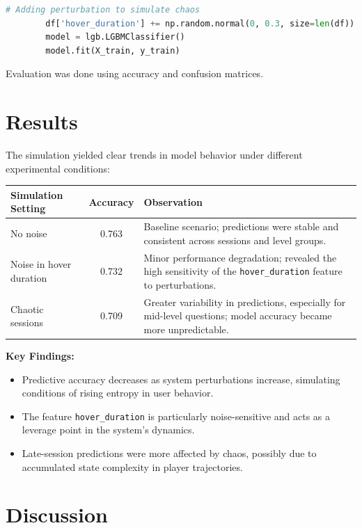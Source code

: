 \documentclass[12pt]{article}
\begin{document}
	\begin{lstlisting}[language=Python, caption=Injecting Perturbations, basicstyle=\ttfamily\small]
		# Adding perturbation to simulate chaos
		df['hover_duration'] += np.random.normal(0, 0.3, size=len(df))
		model = lgb.LGBMClassifier()
		model.fit(X_train, y_train)
	\end{lstlisting}
	
	\noindent Evaluation was done using accuracy and confusion matrices.
	
	\section{Results}
	
	The simulation yielded clear trends in model behavior under different experimental conditions:
	
	\begin{longtable}{|l|c|p{8cm}|}
		\hline
		\textbf{Simulation Setting} & \textbf{Accuracy} & \textbf{Observation} \\
		\hline
		No noise & 0.763 & Baseline scenario; predictions were stable and consistent across sessions and level groups. \\
		Noise in hover duration & 0.732 & Minor performance degradation; revealed the high sensitivity of the \texttt{hover\_duration} feature to perturbations. \\
		Chaotic sessions & 0.709 & Greater variability in predictions, especially for mid-level questions; model accuracy became more unpredictable. \\
		\hline
	\end{longtable}
	
	\noindent \textbf{Key Findings:}
	\begin{itemize}
		\item Predictive accuracy decreases as system perturbations increase, simulating conditions of rising entropy in user behavior.
		\item The feature \texttt{hover\_duration} is particularly noise-sensitive and acts as a leverage point in the system's dynamics.
		\item Late-session predictions were more affected by chaos, possibly due to accumulated state complexity in player trajectories.
	\end{itemize}
	
	\section{Discussion}
	
\end{document}

